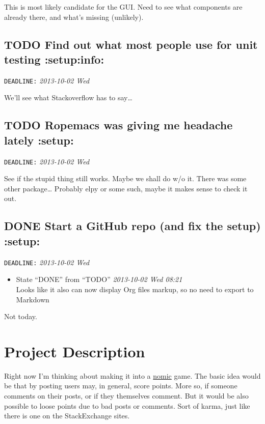 \documentclass[11pt]{article}
\begin{document}
   This is most likely candidate for the GUI. Need to see what
   components are already there, and what's missing (unlikely).
\subsection{\textbf{TODO} Find out what most people use for unit testing \textbf{:setup:info:}}
\label{sec-2-6}

   \texttt{DEADLINE:} \textit{2013-10-02 Wed}

   We'll see what Stackoverflow has to say\ldots{}
   
\subsection{\textbf{TODO} Ropemacs was giving me headache lately \textbf{:setup:}}
\label{sec-2-7}

   \texttt{DEADLINE:} \textit{2013-10-02 Wed}

   See if the stupid thing still works. Maybe we shall do w/o it.
   There was some other package\ldots{} Probably elpy or some such,
   maybe it makes sense to check it out.
\subsection{\textbf{DONE} Start a GitHub repo (and fix the setup) \textbf{:setup:}}
\label{sec-2-8}

   \texttt{DEADLINE:} \textit{2013-10-02 Wed}

\begin{itemize}
\item State ``DONE''       from ``TODO''       \textit{2013-10-02 Wed 08:21} \\
Looks like it also can now display Org files markup, so no need to
     export to Markdown
\end{itemize}
   Not today.
\section{Project Description}
\label{sec-3}

  Right now I'm thinking about making it into a \href{http://en.wikipedia.org/wiki/Nomic}{nomic} game.  The basic
  idea would be that by posting users may, in general, score
  points. More so, if someone comments on their posts, or if they
  themselves comment. But it would be also possible to loose points
  due to bad posts or comments. Sort of karma, just like there is one
  on the StackExchange sites.
\end{document}
